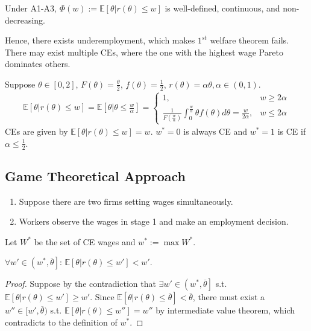\documentclass[11pt]{elegantbook}
\begin{document}
\begin{lemma}
    Under A1-A3, $\Phi(w):=\mathbb{E}[\theta|r(\theta)\leq w]$ is well-defined, continuous, and non-decreasing.
\end{lemma}

Hence, there exists underemployment, which makes $1^{st}$ welfare theorem fails. There may exist multiple CEs, where the one with the highest wage Pareto dominates others.

\begin{example}
    Suppose $\theta\in[0,2]$, $F(\theta)=\frac{\theta}{2}$, $f(\theta)=\frac{1}{2}$, $r(\theta)=\alpha\theta,\alpha\in(0,1)$.
    \begin{equation}
        \begin{aligned}
            \mathbb{E}[\theta|r(\theta)\leq w]=\mathbb{E}\left[\theta|\theta \leq \frac{w}{\alpha}\right]=\left\{\begin{matrix}
                1,&w\geq 2\alpha\\
                \frac{1}{F\left(\frac{w}{\alpha}\right)}\int_0^{\frac{w}{\alpha}}\theta f(\theta)d\theta=\frac{w}{2\alpha},&w\leq 2\alpha
            \end{matrix}\right.
        \end{aligned}
        \nonumber
    \end{equation}
    CEs are given by $\mathbb{E}[\theta|r(\theta)\leq w]=w$. $w^*=0$ is always CE and $w^*=1$ is CE if $\alpha\leq\frac{1}{2}$.
\end{example}

\subsection{Game Theoretical Approach}
\begin{enumerate}
    \item Suppose there are two firms setting wages simultaneously.
    \item Workers observe the wages in stage 1 and make an employment decision.
\end{enumerate}
Let $W^*$ be the set of CE wages and $w^*:=\max W^*$.
\begin{lemma}\label{lemma:ad_l2}
    $\forall w'\in\left(w^*,\overline{\theta}\right]$: $\mathbb{E}[\theta|r(\theta)\leq w']<w'$.
\end{lemma}
\begin{proof}
    Suppose by the contradiction that $\exists w'\in \left(w^*,\overline{\theta}\right]$ s.t. $\mathbb{E}[\theta|r(\theta)\leq w']\geq w'$. Since $\mathbb{E}[\theta|r(\theta)\leq \overline{\theta}]<\overline{\theta}$, there must exist a $w''\in [w',\overline{\theta})$ s.t. $\mathbb{E}[\theta|r(\theta)\leq w'']=w''$ by intermediate value theorem, which contradicts to the definition of $w^*$.
\end{proof}
\end{document}
